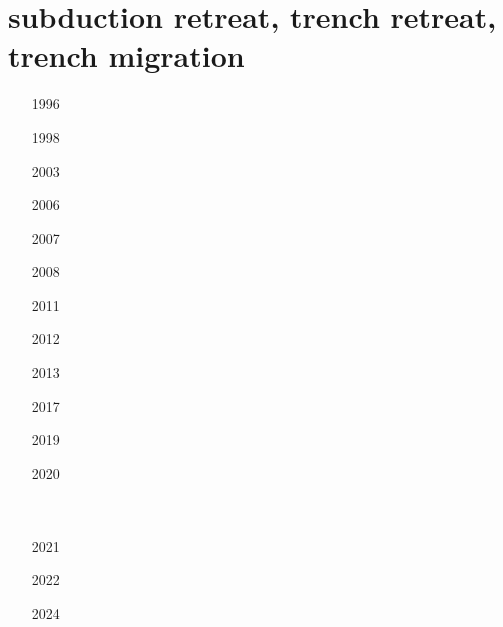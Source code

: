 \section{subduction retreat, trench retreat, trench migration}

\begin{small}
\begin{itemize}
\item[1996]
\item[1998]
\item[2003]
\item[2006]
\item[2007]
\item[2008]
\item[2011]
\item[2012]
\\
\item[2013]
\item[2017]
\\
\item[2019]
\item[2020]
\\
\\
\\
\item[2021]
\item[2022]
\item[2024]
\\
\end{itemize}
\end{small}




